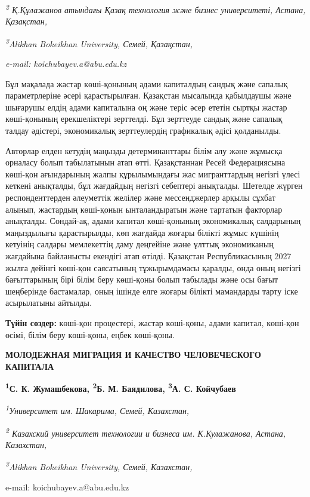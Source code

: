 \emph{\textsuperscript{2} Қ.Құлажанов атындағы Қазақ технология және
бизнес университеті, Астана, Қазақстан,}

\emph{\textsuperscript{3}Alikhan Bokeikhan University, Семей,
Қазақстан,}

\emph{e-mail: koichubayev.a@abu.edu.kz}

Бұл мақалада жастар көші-қонының адами капиталдың сандық және сапалық
параметрлеріне әсері қарастырылған. Қазақстан мысалында қабылдаушы және
шығарушы елдің адами капиталына оң және теріс әсер ететін сыртқы жастар
көші-қонының ерекшеліктері зерттелді. Бұл зерттеуде сандық және сапалық
талдау әдістері, экономикалық зерттеулердің графикалық әдісі қолданылды.

Авторлар елден кетудің маңызды детерминанттары білім алу және жұмысқа
орналасу болып табылатынын атап өтті. Қазақстаннан Ресей Федерациясына
көші-қон ағындарының жалпы құрылымындағы жас мигранттардың негізгі үлесі
кеткені анықталды, бұл жағдайдың негізгі себептері анықталды. Шетелде
жүрген респонденттерден әлеуметтік желілер және мессенджерлер арқылы
сұхбат алынып, жастардың көші-қонын ынталандыратын және тартатын
факторлар анықталды. Сондай-ақ, адами капитал көші-қонының экономикалық
салдарының маңыздылығы қарастырылды, көп жағдайда жоғары білікті жұмыс
күшінің кетуінің салдары мемлекеттің даму деңгейіне және ұлттық
экономиканың жағдайына байланысты екендігі атап өтілді. Қазақстан
Республикасының 2027 жылға дейінгі көші-қон саясатының тұжырымдамасы
қаралды, онда оның негізгі бағыттарының бірі білім беру көші-қоны болып
табылады және осы бағыт шеңберінде бастамалар, оның ішінде елге жоғары
білікті мамандарды тарту іске асырылатыны айтылды.

{\bfseries Түйін сөздер:} көші-қон процестері, жастар көші-қоны, адами
капитал, көші-қон өсімі, білім беру көші-қоны, еңбек көші-қоны.

{\bfseries МОЛОДЕЖНАЯ МИГРАЦИЯ И КАЧЕСТВО ЧЕЛОВЕЧЕСКОГО КАПИТАЛА}

{\bfseries \textsuperscript{1}С. К. Жумашбекова, \textsuperscript{2}Б. М.
Баядилова, \textsuperscript{3}А. С. Койчубаев\textsuperscript{\envelope }}

\emph{\textsuperscript{1}Университет им. Шакарима, Семей, Казахстан,}

\emph{\textsuperscript{2} Казахский университет технологии и бизнеса им.
К.Кулажанова, Астана, Казахстан,}

\emph{\textsuperscript{3}Alikhan Bokeikhan University, Семей,
Казахстан,}

e-mail: koichubayev.a@abu.edu.kz

